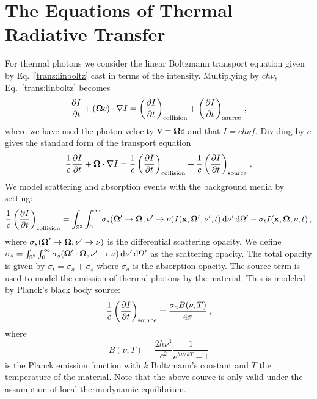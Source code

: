 \documentclass[../doc.tex]{subfiles}
\begin{document}
\section{The Equations of Thermal Radiative Transfer}
For thermal photons we consider the linear Boltzmann transport equation given by Eq.~\ref{trans:linboltz} cast in terms of the intensity. Multiplying by $c h\nu $, Eq.~\ref{trans:linboltz} becomes 
	\begin{equation}
		\frac{\partial I}{\partial t} + (\boldsymbol{\Omega} c) \cdot \nabla I = \left( \frac{\partial I}{\partial t} \right)_\text{collision} + \left( \frac{\partial I}{\partial t} \right)_\text{source} \,, 
	\end{equation}
where we have used the photon velocity $\boldsymbol{\mathrm{v}} = \boldsymbol{\Omega} c$ and that $I = ch\nu f$. Dividing by $c$ gives the standard form of the transport equation 
	\begin{equation}
		\frac{1}{c}\frac{\partial I}{\partial t} + \boldsymbol{\Omega}\cdot \nabla I = \frac{1}{c} \left( \frac{\partial I}{\partial t} \right)_\text{collision} + \frac{1}{c}\left( \frac{\partial I}{\partial t} \right)_\text{source} \,. 
	\end{equation}
We model scattering and absorption events with the background media by setting: 
	\begin{equation}
		\frac{1}{c}\left( \frac{\partial I}{\partial t} \right)_\text{collision} = \int_{\mathbb{S}^2} \int_0^\infty \sigma_s(\boldsymbol{\Omega}'\rightarrow \boldsymbol{\Omega}, \nu' \rightarrow \nu) I(\boldsymbol{\mathrm{x}},\boldsymbol{\Omega}',\nu',t) \mathop{}\!\mathrm{d} \nu' \mathop{}\!\mathrm{d} \Omega' - \sigma_t I(\boldsymbol{\mathrm{x}},\boldsymbol{\Omega},\nu,t) \,,
	\end{equation}
where $\sigma_s(\boldsymbol{\Omega}'\rightarrow\boldsymbol{\Omega},\nu'\rightarrow \nu)$ is the differential scattering opacity. We define $\sigma_s = \int_{\mathbb{S}^2} \int_0^\infty \sigma_s(\boldsymbol{\Omega}'\cdot\boldsymbol{\Omega},\nu'\rightarrow\nu) \mathop{}\!\mathrm{d} \nu'\mathop{}\!\mathrm{d}\Omega'$ as the scattering opacity. The total opacity is given by $\sigma_t = \sigma_a + \sigma_s$ where $\sigma_a$ is the absorption opacity. The source term is used to model the emission of thermal photons by the material. This is modeled by Planck's black body source: 
	\begin{equation}
		\frac{1}{c}\left( \frac{\partial I}{\partial t} \right)_\text{source} =\frac{\sigma_a B(\nu,T)}{4\pi} \,,
	\end{equation}
where
	\begin{equation}
		B(\nu,T) = \frac{2h\nu^3}{c^2}\frac{1}{e^{h\nu/kT}-1}
	\end{equation}
is the Planck emission function with $k$ Boltzmann's constant and $T$ the temperature of the material. Note that the above source is only valid under the assumption of local thermodynamic equilibrium. 
\end{document}
